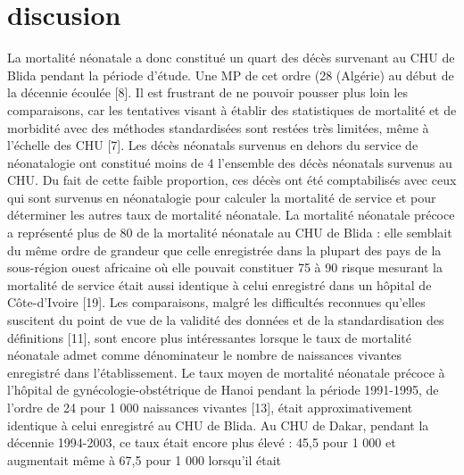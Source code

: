 \section{discusion}
La mortalité néonatale a donc constitué un quart des décès
survenant au CHU de Blida pendant la période d’étude. Une
MP de cet ordre (28 %
(Algérie) au début de la décennie écoulée [8]. Il est frustrant
de ne pouvoir pousser plus loin les comparaisons, car les
tentatives visant à établir des statistiques de mortalité et de
morbidité avec des méthodes standardisées sont restées très
limitées, même à l’échelle des CHU [7].
Les décès néonatals survenus en dehors du service de
néonatalogie ont constitué moins de 4 %
l’ensemble des décès néonatals survenus au CHU. Du fait
de cette faible proportion, ces décès ont été comptabilisés
avec ceux qui sont survenus en néonatalogie pour calculer
la mortalité de service et pour déterminer les autres taux de
mortalité néonatale.
La mortalité néonatale précoce a représenté plus de 80 %
de la mortalité néonatale au CHU de Blida : elle semblait du
même ordre de grandeur que celle enregistrée dans la plupart
des pays de la sous-région ouest africaine où elle pouvait
constituer 75 à 90 %
risque mesurant la mortalité de service était aussi identique à
celui enregistré dans un hôpital de Côte-d’Ivoire [19].
Les comparaisons, malgré les difficultés reconnues
qu’elles suscitent du point de vue de la validité des données
et de la standardisation des définitions [11], sont encore plus
intéressantes lorsque le taux de mortalité néonatale admet
comme dénominateur le nombre de naissances vivantes
enregistré dans l’établissement.
Le taux moyen de mortalité néonatale précoce à l’hôpital
de gynécologie-obstétrique de Hanoi pendant la période
1991-1995, de l’ordre de 24 pour 1 000 naissances vivantes
[13], était approximativement identique à celui enregistré au
CHU de Blida. Au CHU de Dakar, pendant la décennie
1994-2003, ce taux était encore plus élevé : 45,5 pour
1 000 et augmentait même à 67,5 pour 1 000 lorsqu’il était

